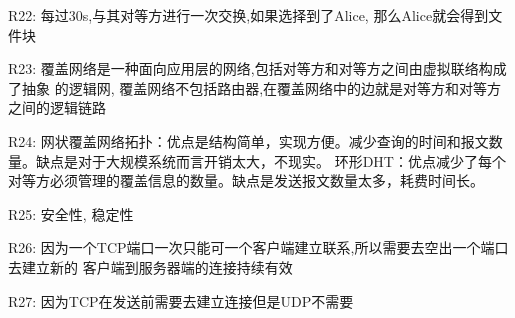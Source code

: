 \documentclass[UTF8]{ctexart}
\begin{document}
R22:
每过30s,与其对等方进行一次交换,如果选择到了Alice, 那么Alice就会得到文件块

R23:
覆盖网络是一种面向应用层的网络,包括对等方和对等方之间由虚拟联络构成了抽象
的逻辑网, 覆盖网络不包括路由器,在覆盖网络中的边就是对等方和对等方之间的逻辑链路

R24:
网状覆盖网络拓扑：优点是结构简单，实现方便。减少查询的时间和报文数量。缺点是对于大规模系统而言开销太大，不现实。
环形DHT：优点减少了每个对等方必须管理的覆盖信息的数量。缺点是发送报文数量太多，耗费时间长。

R25:
安全性, 稳定性

R26:
因为一个TCP端口一次只能可一个客户端建立联系,所以需要去空出一个端口去建立新的
客户端到服务器端的连接持续有效

R27:
因为TCP在发送前需要去建立连接但是UDP不需要
\end{document}
